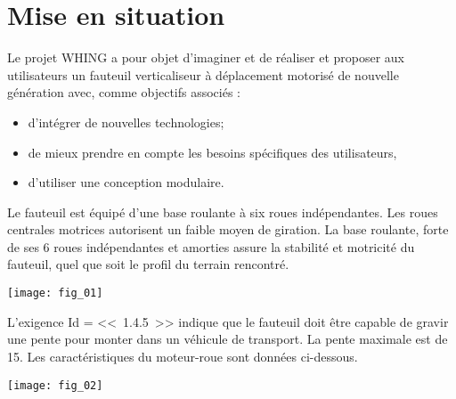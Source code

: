 \section*{Mise en situation}
\ifprof
\else
\fi

Le projet WHING a pour objet d'imaginer et de réaliser et proposer aux utilisateurs un fauteuil verticaliseur à déplacement motorisé de nouvelle génération avec, comme objectifs associés : 
\begin{itemize}
\item d'intégrer de nouvelles technologies; 
\item de mieux prendre en compte les besoins spécifiques des utilisateurs, 
\item d'utiliser une conception modulaire. 
\end{itemize}

Le fauteuil est équipé d'une base roulante à six roues indépendantes. Les roues centrales motrices autorisent un faible moyen de giration. La base roulante, forte de ses 6 roues indépendantes et amorties assure la stabilité et motricité du fauteuil, quel que soit le profil du terrain rencontré. 


\begin{center}
\texttt{[image: fig\_01]}
\end{center}




\begin{obj} 

L'exigence Id = <<~1.4.5~>> indique que le fauteuil doit être capable de gravir une pente pour
monter dans un véhicule de transport. La pente maximale est de 15\degres. Les caractéristiques du moteur-roue
sont données ci-dessous.
\end{obj}


\begin{center}
\texttt{[image: fig\_02]}
\end{center}

